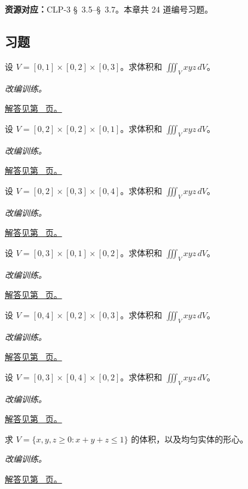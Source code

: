 \documentclass[UTF8,12pt,a4paper,fontset=fandol]{ctexart}
\begin{document}
\textbf{资源对应：}CLP-3 \S~3.5--\S~3.7。本章共 24 道编号习题。
\subsection{习题}
\begin{example}[长方体上的体积矩]\label{ex:c38q1}
设 $V=[0,1]\times[0,2]\times[0,3]$。求体积和 $\displaystyle\iiint_Vxyz\,dV$。
\par\textit{改编训练。}\par\hyperref[ans:c38q1]{解答见第~\pageref{ans:c38q1} 页。}
\end{example}
\begin{example}[长方体上的体积矩]\label{ex:c38q2}
设 $V=[0,2]\times[0,2]\times[0,1]$。求体积和 $\displaystyle\iiint_Vxyz\,dV$。
\par\textit{改编训练。}\par\hyperref[ans:c38q2]{解答见第~\pageref{ans:c38q2} 页。}
\end{example}
\begin{example}[长方体上的体积矩]\label{ex:c38q3}
设 $V=[0,2]\times[0,3]\times[0,4]$。求体积和 $\displaystyle\iiint_Vxyz\,dV$。
\par\textit{改编训练。}\par\hyperref[ans:c38q3]{解答见第~\pageref{ans:c38q3} 页。}
\end{example}
\begin{example}[长方体上的体积矩]\label{ex:c38q4}
设 $V=[0,3]\times[0,1]\times[0,2]$。求体积和 $\displaystyle\iiint_Vxyz\,dV$。
\par\textit{改编训练。}\par\hyperref[ans:c38q4]{解答见第~\pageref{ans:c38q4} 页。}
\end{example}
\begin{example}[长方体上的体积矩]\label{ex:c38q5}
设 $V=[0,4]\times[0,2]\times[0,3]$。求体积和 $\displaystyle\iiint_Vxyz\,dV$。
\par\textit{改编训练。}\par\hyperref[ans:c38q5]{解答见第~\pageref{ans:c38q5} 页。}
\end{example}
\begin{example}[长方体上的体积矩]\label{ex:c38q6}
设 $V=[0,3]\times[0,4]\times[0,2]$。求体积和 $\displaystyle\iiint_Vxyz\,dV$。
\par\textit{改编训练。}\par\hyperref[ans:c38q6]{解答见第~\pageref{ans:c38q6} 页。}
\end{example}
\begin{example}[四面体体积与形心]\label{ex:c38q7}
求 $V=\{x,y,z\ge0:x+y+z\le 1\}$ 的体积，以及均匀实体的形心。
\par\textit{改编训练。}\par\hyperref[ans:c38q7]{解答见第~\pageref{ans:c38q7} 页。}
\end{example}
\end{document}
